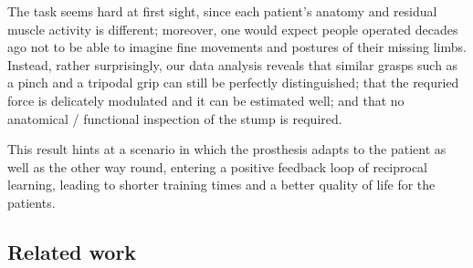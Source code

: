 The task seems hard at first sight, since each patient's anatomy and residual
muscle activity is different; moreover, one would expect people operated
decades ago not to be able to imagine fine movements and postures of their
missing limbs. Instead, rather surprisingly, our data analysis reveals that
similar grasps such as a pinch and a tripodal grip can still be perfectly
distinguished; that the requried force is delicately modulated and it can be
estimated well; and that no anatomical / functional inspection of the stump
is required.

This result hints at a scenario in which the prosthesis adapts to the patient
as well as the other way round, entering a positive feedback loop
of reciprocal learning, leading to shorter training times and a better
quality of life for the patients.


\subsection{Related work}
